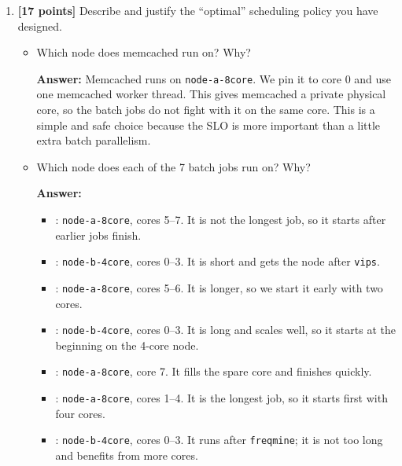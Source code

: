 \begin{enumerate}
\begin{enumerate}
    In all three runs, the p95 latency bars remain below the 1 ms SLO line while all seven PARSEC jobs complete successfully.
    \\

    \item \textbf{[17 points]} Describe and justify the “optimal” scheduling policy you have designed.

    \begin{itemize}
        \item Which node does memcached run on? Why?

        \textbf{Answer:} Memcached runs on \texttt{node-a-8core}. We pin it to core 0 and use one memcached worker thread. This gives memcached a private physical core, so the batch jobs do not fight with it on the same core. This is a simple and safe choice because the SLO is more important than a little extra batch parallelism.
        \\

        \item Which node does each of the 7 batch jobs run on? Why?

        \textbf{Answer:}
        \begin{itemize}
            \item {}: \texttt{node-a-8core}, cores 5--7. It is not the longest job, so it starts after earlier jobs finish.
            \item {}: \texttt{node-b-4core}, cores 0--3. It is short and gets the node after \texttt{vips}.
            \item {}: \texttt{node-a-8core}, cores 5--6. It is longer, so we start it early with two cores.
            \item {}: \texttt{node-b-4core}, cores 0--3. It is long and scales well, so it starts at the beginning on the 4-core node.
            \item {}: \texttt{node-a-8core}, core 7. It fills the spare core and finishes quickly.
            \item {}: \texttt{node-a-8core}, cores 1--4. It is the longest job, so it starts first with four cores.
            \item {}: \texttt{node-b-4core}, cores 0--3. It runs after \texttt{freqmine}; it is not too long and benefits from more cores.
            \\
        \end{itemize}


\end{itemize}
\end{enumerate}
\end{enumerate}
